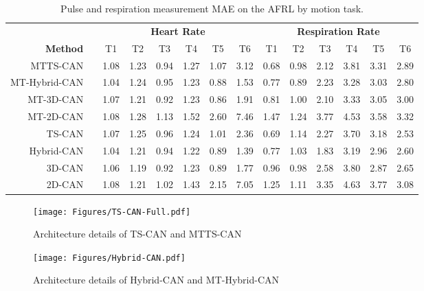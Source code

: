 \documentclass{article}
\begin{document}
\begin{table*}[t]
	\caption{Pulse and respiration measurement MAE on the AFRL by motion task.}
	\label{tab:sm_tasks}
	\centering
	\small
	\setlength\tabcolsep{3pt} \begin{tabular}{rc|cccccc|cccccc}
	\toprule
		&& \multicolumn{6}{c}{\textbf{Heart Rate}} &  \multicolumn{6}{c}{\textbf{Respiration Rate}}  \\
        \textbf{Method} && T1 & T2  & T3 & T4 & T5 & T6 &  T1 & T2  & T3 & T4 & T5 & T6 \\ \hline \hline
        MTTS-CAN && 1.08 & 1.23 & 0.94 & 1.27 & 1.07 & 3.12 & 0.68 & 0.98 & 2.12 & 3.81 & 3.31 & 2.89 \\
        MT-Hybrid-CAN && 1.04 & 1.24 & 0.95 & 1.23 & 0.88 & 1.53 & 0.77 & 0.89 & 2.23 & 3.28 & 3.03 & 2.80 \\
        MT-3D-CAN && 1.07 & 1.21 & 0.92 & 1.23 & 0.86 & 1.91 & 0.81 & 1.00 & 2.10 & 3.33 & 3.05 & 3.00 \\
        MT-2D-CAN && 1.08 & 1.28 & 1.13 & 1.52 & 2.60 & 7.46 & 1.47 & 1.24 & 3.77 & 4.53 & 3.58 & 3.32 \\
        TS-CAN && 1.07 & 1.25 & 0.96 & 1.24 & 1.01 & 2.36 & 0.69 & 1.14 & 2.27 & 3.70 & 3.18 & 2.53 \\
        Hybrid-CAN && 1.04 & 1.21 & 0.94 & 1.22 & 0.89 & 1.39 & 0.77 & 1.03 & 1.83 & 3.19 & 2.96 & 2.60 \\
        3D-CAN && 1.06 & 1.19 & 0.92 & 1.23 & 0.89 & 1.77 & 0.96 & 0.98 & 2.58 & 3.80 & 2.87 & 2.65 \\ \hdashline
        2D-CAN && 1.08 & 1.21 & 1.02 & 1.43 & 2.15 & 7.05 & 1.25 & 1.11 & 3.35 & 4.63 & 3.77 & 3.08 \\
        
   \end{tabular}
    \vspace{-0.3cm}
\end{table*}


\begin{figure*}[p]
  \texttt{[image: Figures/TS-CAN-Full.pdf]}
  \caption{Architecture details of TS-CAN and MTTS-CAN}
  \label{fig:MTTS-CAN}
\end{figure*}

\begin{figure*}[p!]
  \texttt{[image: Figures/Hybrid-CAN.pdf]}
  \caption{Architecture details of Hybrid-CAN and MT-Hybrid-CAN}
  \label{fig:Hybrid-CAN}
\end{figure*}
\end{document}
